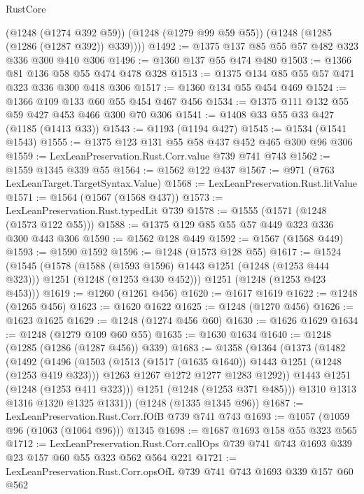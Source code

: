 \begin{lexlean}{RustCore}
\begin{coremodule}
        (@1248 (@1274 @392 @59))
        (@1248 (@1279 @99 @59 @55))
        (@1248 (@1285 (@1286 (@1287 @392)) @339))))
@1492 := @1375 @137 @85 @55 @57 @482 @323 @336 @300 @410 @306
@1496 := @1360 @137 @55 @474 @480
@1503 := @1366 @81 @136 @58 @55 @474 @478 @328
@1513 := @1375 @134 @85 @55 @57 @471 @323 @336 @300 @418 @306
@1517 := @1360 @134 @55 @454 @469
@1524 := @1366 @109 @133 @60 @55 @454 @467 @456
@1534 := @1375 @111 @132 @55 @59 @427 @453 @466 @300 @70 @306
@1541 := @1408 @33 @55 @33 @427 (@1185 (@1413 @33))
@1543 := @1193 (@1194 @427)
@1545 := @1534 (@1541 @1543)
@1555 := @1375 @123 @131 @55 @58 @437 @452 @465 @300 @96 @306
@1559 := LexLeanPreservation.Rust.Corr.value @739 @741 @743
@1562 := @1559 @1345 @339 @55
@1564 := @1562 @122 @437
@1567 := @971 (@763 LexLeanTarget.TargetSyntax.Value)
@1568 := LexLeanPreservation.Rust.litValue
@1571 := @1564 (@1567 (@1568 @437))
@1573 := LexLeanPreservation.Rust.typedLit @739
@1578 := @1555 (@1571 (@1248 (@1573 @122 @55)))
@1588 := @1375 @129 @85 @55 @57 @449 @323 @336 @300 @443 @306
@1590 := @1562 @128 @449
@1592 := @1567 (@1568 @449)
@1593 := @1590 @1592
@1596 := @1248 (@1573 @128 @55)
@1617 := @1524
    (@1545
      (@1578
        (@1588 (@1593 @1596) @1443 @1251 (@1248 (@1253 @444 @323)))
        @1251
        (@1248 (@1253 @430 @452)))
      @1251
      (@1248 (@1253 @423 @453)))
@1619 := @1260 (@1261 @456)
@1620 := @1617 @1619
@1622 := @1248 (@1265 @456)
@1623 := @1620 @1622
@1625 := @1248 (@1270 @456)
@1626 := @1623 @1625
@1629 := @1248 (@1274 @456 @60)
@1630 := @1626 @1629
@1634 := @1248 (@1279 @109 @60 @55)
@1635 := @1630 @1634
@1640 := @1248 (@1285 (@1286 (@1287 @456)) @339)
@1683 := @1358
    (@1364
      (@1373
        (@1482
          (@1492
            (@1496
              (@1503
                (@1513 (@1517 (@1635 @1640)) @1443 @1251 (@1248 (@1253 @419 @323)))
                @1263
                @1267
                @1272
                @1277
                @1283
                @1292))
            @1443
            @1251
            (@1248 (@1253 @411 @323)))
          @1251
          (@1248 (@1253 @371 @485)))
        @1310
        @1313
        @1316
        @1320
        @1325
        @1331))
    (@1248 (@1335 @1345 @96))
@1687 := LexLeanPreservation.Rust.Corr.fOfB @739 @741 @743
@1693 := @1057 (@1059 @96 (@1063 (@1064 @96))) @1345
@1698 := @1687 @1693 @158 @55 @323 @565
@1712 := LexLeanPreservation.Rust.Corr.callOps
    @739
    @741
    @743
    @1693
    @339
    @23
    @157
    @60
    @55
    @323
    @562
    @564
    @221
@1721 := LexLeanPreservation.Rust.Corr.opsOfL @739 @741 @743 @1693 @339 @157 @60 @562

\end{coremodule}
\end{lexlean}
